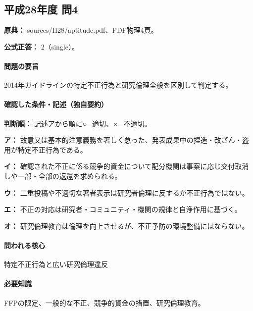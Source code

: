 \subsection{平成28年度 問4}
\label{q:h28-reg-apt-04}

\noindent\textbf{原典：} sources/H28/aptitude.pdf、PDF物理4頁。

\textbf{公式正答：} 2（single）。

\paragraph{問題の要旨} 2014年ガイドラインの特定不正行為と研究倫理全般を区別して判定する。

\paragraph{確認した条件・記述（独自要約）}\mbox{}\par

\noindent\textbf{判断順：} 記述アから順に○=適切、×=不適切。\par

\noindent\textbf{ア：} 故意又は基本的注意義務を著しく怠った、発表成果中の捏造・改ざん・盗用が特定不正行為である。\par

\noindent\textbf{イ：} 確認された不正に係る競争的資金について配分機関は事案に応じ交付取消しや一部・全部の返還を求められる。\par

\noindent\textbf{ウ：} 二重投稿や不適切な著者表示は研究者倫理に反するが不正行為ではない。\par

\noindent\textbf{エ：} 不正の対応は研究者・コミュニティ・機関の規律と自浄作用に基づく。\par

\noindent\textbf{オ：} 研究倫理教育は倫理を向上させるが、不正予防の環境整備にはならない。\par

\paragraph{問われる核心} 特定不正行為と広い研究倫理違反

\paragraph{必要知識} FFPの限定、一般的な不正、競争的資金の措置、研究倫理教育。

